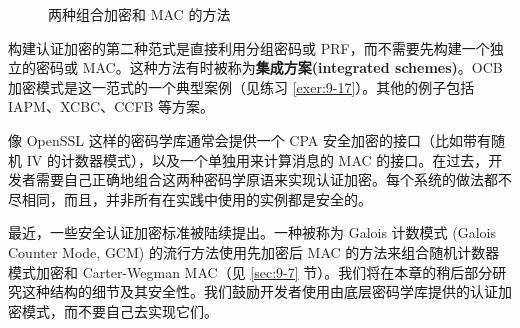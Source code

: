 \begin{figure}
	\centering
	
	\caption{两种组合加密和 MAC 的方法}
	\label{fig:9-1}
\end{figure}

构建认证加密的第二种范式是直接利用分组密码或 PRF，而不需要先构建一个独立的密码或 MAC。这种方法有时被称为\textbf{集成方案(integrated schemes)}。OCB 加密模式是这一范式的一个典型案例（见练习 \ref{exer:9-17}）。其他的例子包括 IAPM、XCBC、CCFB 等方案。

\begin{snote}[认证加密标准。]
像 OpenSSL 这样的密码学库通常会提供一个 CPA 安全加密的接口（比如带有随机 IV 的计数器模式），以及一个单独用来计算消息的 MAC 的接口。在过去，开发者需要自己正确地组合这两种密码学原语来实现认证加密。每个系统的做法都不尽相同，而且，并非所有在实践中使用的实例都是安全的。

最近，一些安全认证加密标准被陆续提出。一种被称为 Galois 计数模式 (Galois Counter Mode, GCM) 的流行方法使用先加密后 MAC 的方法来组合随机计数器模式加密和 Carter-Wegman MAC（见 \ref{sec:9-7} 节）。我们将在本章的稍后部分研究这种结构的细节及其安全性。我们鼓励开发者使用由底层密码学库提供的认证加密模式，而不要自己去实现它们。
\end{snote}















